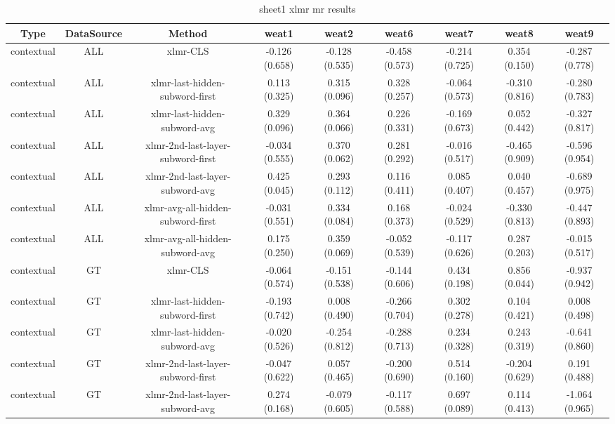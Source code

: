 \begin{sidewaystable}[htb]
    \centering
    \caption{sheet1 xlmr mr results}
    \label{appendix_tab:sheet1_xlmr_mr_results}
    \small
    \begin{tabular}{@{}ccccccccc@{}}
        \toprule
        Type & DataSource & Method & weat1 & weat2 & weat6 & weat7 & weat8 & weat9 \\
        \midrule
        contextual & ALL & xlmr-CLS & -0.126 (0.658) & -0.128 (0.535) & -0.458 (0.573) & -0.214 (0.725) & 0.354 (0.150) & -0.287 (0.778) \\
        contextual & ALL & xlmr-last-hidden-subword-first & 0.113 (0.325) & 0.315 (0.096) & 0.328 (0.257) & -0.064 (0.573) & -0.310 (0.816) & -0.280 (0.783) \\
        contextual & ALL & xlmr-last-hidden-subword-avg & 0.329 (0.096) & 0.364 (0.066) & 0.226 (0.331) & -0.169 (0.673) & 0.052 (0.442) & -0.327 (0.817) \\
        contextual & ALL & xlmr-2nd-last-layer-subword-first & -0.034 (0.555) & 0.370 (0.062) & 0.281 (0.292) & -0.016 (0.517) & -0.465 (0.909) & -0.596 (0.954) \\
        contextual & ALL & xlmr-2nd-last-layer-subword-avg & 0.425 (0.045) & 0.293 (0.112) & 0.116 (0.411) & 0.085 (0.407) & 0.040 (0.457) & -0.689 (0.975) \\
        contextual & ALL & xlmr-avg-all-hidden-subword-first & -0.031 (0.551) & 0.334 (0.084) & 0.168 (0.373) & -0.024 (0.529) & -0.330 (0.813) & -0.447 (0.893) \\
        contextual & ALL & xlmr-avg-all-hidden-subword-avg & 0.175 (0.250) & 0.359 (0.069) & -0.052 (0.539) & -0.117 (0.626) & 0.287 (0.203) & -0.015 (0.517) \\
        contextual & GT & xlmr-CLS & -0.064 (0.574) & -0.151 (0.538) & -0.144 (0.606) & 0.434 (0.198) & 0.856 (0.044) & -0.937 (0.942) \\
        contextual & GT & xlmr-last-hidden-subword-first & -0.193 (0.742) & 0.008 (0.490) & -0.266 (0.704) & 0.302 (0.278) & 0.104 (0.421) & 0.008 (0.498) \\
        contextual & GT & xlmr-last-hidden-subword-avg & -0.020 (0.526) & -0.254 (0.812) & -0.288 (0.713) & 0.234 (0.328) & 0.243 (0.319) & -0.641 (0.860) \\
        contextual & GT & xlmr-2nd-last-layer-subword-first & -0.047 (0.622) & 0.057 (0.465) & -0.200 (0.690) & 0.514 (0.160) & -0.204 (0.629) & 0.191 (0.488) \\
        contextual & GT & xlmr-2nd-last-layer-subword-avg & 0.274 (0.168) & -0.079 (0.605) & -0.117 (0.588) & 0.697 (0.089) & 0.114 (0.413) & -1.064 (0.965) \\

\end{tabular}
\end{sidewaystable}
